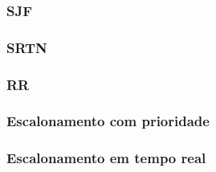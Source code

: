 \documentclass{beamer}
\begin{document}
\begin{frame}
\frametitle{SJF} 
\justifying
\end{frame}

\begin{frame}
\frametitle{SRTN} 
\justifying
\end{frame}

\begin{frame}
\frametitle{RR} 
\justifying
\end{frame}

\begin{frame}
\frametitle{Escalonamento com prioridade} 
\justifying
\end{frame}

\begin{frame}
\frametitle{Escalonamento em tempo real} 
\justifying
\end{frame}
\end{document}
